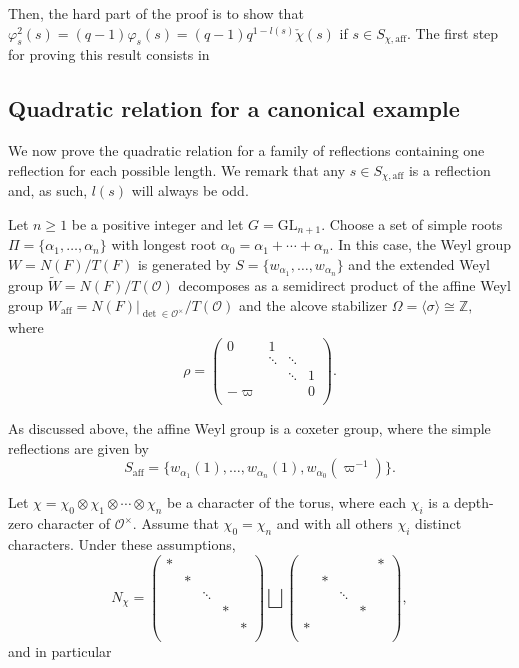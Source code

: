 \documentclass{article}
\newcommand{\aff}{\mathrm{aff}}
\newcommand{\cO}{\mathcal{O}}
\newcommand{\ZZ}{\mathbb{Z}}
\theoremstyle{plain}
\theoremstyle{definition}
\begin{document}
    Then, the hard part of the proof is to show that $\varphi_s^2(s)=(q-1)\varphi_s(s)=(q-1)q^{1-l(s)}\check{\chi}(s)$ if $s\in S_{\chi,\aff}$.
    The first step for proving this result consists in 

    \subsection{Quadratic relation for a canonical example}
    We now prove the quadratic relation for a family of reflections containing one reflection for each possible length. We remark that any $s\in S_{\chi,\aff}$ is a reflection and, as such, $l(s)$ will always be odd.

    Let $n\geq1$ be a positive integer and let $G=\mathrm{GL}_{n+1}$. Choose a set of simple roots $\Pi=\{\alpha_1,\ldots,\alpha_n\}$ with longest root $\alpha_0=\alpha_1+\cdots+\alpha_n$. In this case, the Weyl group $W=N(F)/T(F)$ is generated by $S=\{w_{\alpha_1},\ldots,w_{\alpha_n}\}$ and the extended Weyl group $\tilde{W}=N(F)/T(\cO)$ decomposes as a semidirect product of the affine Weyl group $W_{\aff}=N(F)|_{\det\in\cO^\times}/T(\cO)$ and the alcove stabilizer $\Omega=\langle\sigma\rangle\cong\ZZ,$ where
    $$\rho=\begin{pmatrix}
        0&1&&\\
        &\ddots&\ddots&\\
        &&\ddots&1\\
        -\varpi &&&0\\
    \end{pmatrix}.$$

    As discussed above, the affine Weyl group is a coxeter group, where the simple reflections are given by 
    $$S_{\aff}=\{w_{\alpha_1}(1),\ldots,w_{\alpha_n}(1),w_{\alpha_0}(\varpi^{-1})\}.$$

    Let $\chi=\chi_0\otimes\chi_1\otimes\cdots\otimes\chi_n$ be a character of the torus, where each $\chi_i$ is a depth-zero character of $\cO^\times$. Assume that $\chi_0=\chi_n$ and with all others $\chi_i$ distinct characters. Under these assumptions, 
    $$N_\chi=\begin{pmatrix}
        *&&&&\\
        &*&&&\\
        &&\ddots&&\\
        &&&*&\\
        &&&&*\\
    \end{pmatrix}\bigsqcup\begin{pmatrix}
        &&&&*\\
        &*&&&\\
        &&\ddots&&\\
        &&&*&\\
        *&&&&\\
    \end{pmatrix},$$
    and in particular
\end{document}
